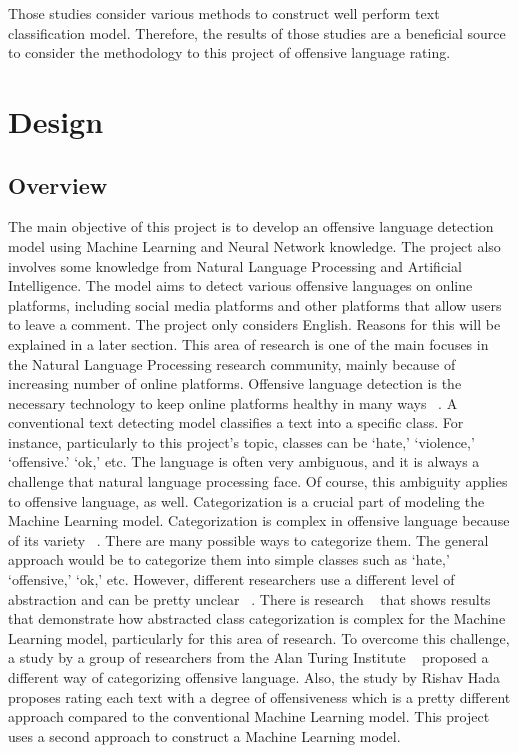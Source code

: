 \documentclass[11pt, natbib=false]{article}
\begin{document}
Those studies consider various methods to construct well perform text classification model.
Therefore, the results of those studies are a beneficial source to consider the methodology to this project of offensive language rating. 



\section{Design}
\subsection{Overview}
The main objective of this project is to develop an offensive language detection model using Machine Learning and Neural Network knowledge.
The project also involves some knowledge from Natural Language Processing and Artificial Intelligence. The model aims to detect various offensive languages on online platforms, including social media platforms and other platforms that allow users to leave a comment.
The project only considers English.
Reasons for this will be explained in a later section.
This area of research is one of the main focuses in the Natural Language Processing research community, mainly because of increasing number of online platforms.
Offensive language detection is the necessary technology to keep online platforms healthy in many ways ~\cite{vidgen2019challenges}. A conventional text detecting model classifies a text into a specific class.
For instance, particularly to this project’s topic, classes can be ‘hate,’ ‘violence,’ ‘offensive.’ ‘ok,’ etc. The language is often very ambiguous, and it is always a challenge that natural language processing face.
Of course, this ambiguity applies to offensive language, as well. Categorization is a crucial part of modeling the Machine Learning model.
Categorization is complex in offensive language because of its variety ~\cite{vidgen2019challenges}.
There are many possible ways to categorize them. The general approach would be to categorize them into simple classes such as ‘hate,’ ‘offensive,’ ‘ok,’ etc. However, different researchers use a different level of abstraction and can be pretty unclear ~\cite{vidgen2019challenges}.
There is research ~\cite{malmasi2017detecting} that shows results that demonstrate how abstracted class categorization is complex for the Machine Learning model, particularly for this area of research.
To overcome this challenge, a study by a group of researchers from the Alan Turing Institute ~\cite{vidgen2019challenges} proposed a different way of categorizing offensive language.
Also, the study by Rishav Hada ~\cite{hada2021ruddit} proposes rating each text with a degree of offensiveness which is a pretty different approach compared to the conventional Machine Learning model.
This project uses a second approach to construct a Machine Learning model.
\end{document}

